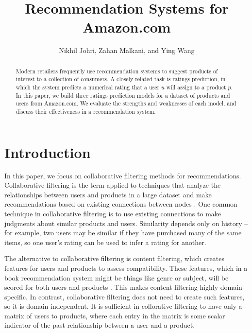 \documentclass[letterpaper, 10 pt, twocolumn]{article}
\title{\LARGE \bf
Recommendation Systems for Amazon.com
}
\author{Nikhil Johri, Zahan Malkani, and Ying Wang
}
\begin{document}
\maketitle
\thispagestyle{empty}
\pagestyle{empty}


\begin{abstract}
Modern retailers frequently use recommendation systems to suggest products of 
interest to a collection of consumers. A closely related task is ratings 
prediction, in which the system predicts a numerical rating that a 
user $u$ will assign to a product $p$. In this paper, we build three ratings 
prediction models for a dataset of products and users from Amazon.com. We 
evaluate the strengths and weaknesses of each model, and discuss their 
effectiveness in a recommendation system.

\end{abstract}

\section{Introduction}
In this paper, we focus on collaborative filtering methods for recommendations. 
Collaborative filtering is the term applied to techniques that analyze the 
relationships between users and products in a large dataset and make 
recommendations based on existing connections between nodes \cite{bib:recsys}.
One common technique in collaborative filtering is to use existing connections 
to make judgments about similar products and users. Similarity depends only on 
history -- for example, two users may be similar if they have purchased many 
of the same items, so one user's rating can be used to infer a rating for 
another. 

The alternative to collaborative filtering is content filtering, which 
creates features for users and products to assess compatibility. These 
features, which in a book recommendation system might be things like genre or 
subject, will be scored for both users and products \cite{bib:recsys}. This 
makes content filtering highly domain-specific. 
In contrast, collaborative filtering does not need to create such features, 
so it is domain-independent. It is sufficient in collorative filtering to have 
only a matrix of users to products, where each entry in the matrix is some 
scalar indicator of the past relationship between a user and a product.
\end{document}
